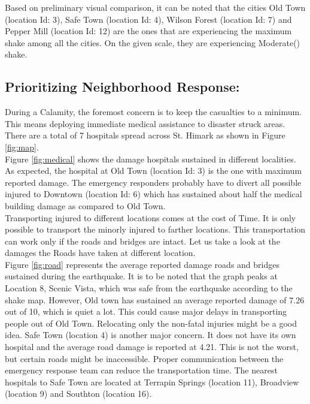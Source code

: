\documentclass[12pt]{extarticle}
\begin{document}
Based on preliminary visual comparison, it can be noted that the cities Old Town (location Id: 3), Safe Town (location Id: 4), Wilson Forest (location Id: 7) and Pepper Mill (location Id: 12) are the ones that are experiencing the maximum shake among all the cities. On the given scale, they are experiencing Moderate() shake. 
	
\subsection{Prioritizing Neighborhood Response:}
During a Calamity, the foremost concern is to keep the casualties to a minimum. This means deploying immediate medical assistance to disaster struck areas. There are a total of 7 hospitals spread across St. Himark as shown in Figure \ref{fig:map}.  \\

Figure \ref{fig:medical} shows the damage hospitals sustained in different localities. As expected, the hospital at Old Town (location Id: 3) is the one with maximum reported damage. The emergency responders probably have to divert all possible injured to Downtown (location Id: 6) which has sustained about half the medical building damage as compared to Old Town.  \\

Transporting injured to different locations comes at the cost of Time. It is only possible to transport the minorly injured to farther locations. This transportation can work only if the roads and bridges are intact. Let us take a look at the damages the Roads have taken at different location.  \\

Figure \ref{fig:road} represents the average reported damage roads and bridges sustained during the earthquake. It is to be noted that the graph peaks at Location 8, Scenic Vista, which was safe from the earthquake according to the shake map. However, Old town has sustained an average reported damage of 7.26 out of 10, which is quiet a lot. This could cause major delays in transporting people out of Old Town. Relocating only the non-fatal injuries might be a good idea. Safe Town (location 4) is another major concern. It does not have its own hospital and the average road damage is reported at 4.21. This is not the worst, but certain roads might be inaccessible. Proper communication between the emergency response team can reduce the transportation time. The nearest hospitals to Safe Town are located at Terrapin Springs (location 11), Broadview (location 9) and Southton (location 16). \\ 
\end{document}
